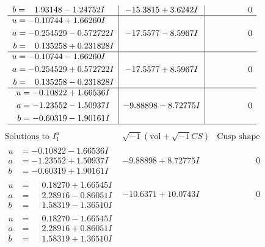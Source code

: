 \documentclass[1p]{elsarticle_modified}
\theoremstyle{definition}
\newcommand{\I}{\sqrt{-1}}
\begin{document}
$$\begin{array}{c|c|c}
\begin{aligned}
b &= \phantom{-}1.93148 - 1.24752 I\end{aligned}
 & -15.3815 + 3.6242 I & \phantom{-0.000000 } 0 \\ \hline\begin{aligned}
u &= -0.10744 + 1.66260 I \\
a &= -0.254529 - 0.572722 I \\
b &= \phantom{-}0.135258 + 0.231828 I\end{aligned}
 & -17.5577 - 8.5967 I & \phantom{-0.000000 } 0 \\ \hline\begin{aligned}
u &= -0.10744 - 1.66260 I \\
a &= -0.254529 + 0.572722 I \\
b &= \phantom{-}0.135258 - 0.231828 I\end{aligned}
 & -17.5577 + 8.5967 I & \phantom{-0.000000 } 0 \\ \hline\begin{aligned}
u &= -0.10822 + 1.66536 I \\
a &= -1.23552 - 1.50937 I \\
b &= -0.60319 - 1.90161 I\end{aligned}
 & -9.88898 - 8.72775 I & \phantom{-0.000000 } 0\\
 \hline 
 \end{array}$$\newpage$$\begin{array}{c|c|c}  
\text{Solutions to }I^u_{1}& \I (\text{vol} + \sqrt{-1}CS) & \text{Cusp shape}\\
 \hline 
\begin{aligned}
u &= -0.10822 - 1.66536 I \\
a &= -1.23552 + 1.50937 I \\
b &= -0.60319 + 1.90161 I\end{aligned}
 & -9.88898 + 8.72775 I & \phantom{-0.000000 } 0 \\ \hline\begin{aligned}
u &= \phantom{-}0.18270 + 1.66545 I \\
a &= \phantom{-}2.28916 - 0.86051 I \\
b &= \phantom{-}1.58319 - 1.36510 I\end{aligned}
 & -10.6371 + 10.0743 I & \phantom{-0.000000 } 0 \\ \hline\begin{aligned}
u &= \phantom{-}0.18270 - 1.66545 I \\
a &= \phantom{-}2.28916 + 0.86051 I \\
b &= \phantom{-}1.58319 + 1.36510 I\end{aligned}

\end{array}$$
\end{document}
